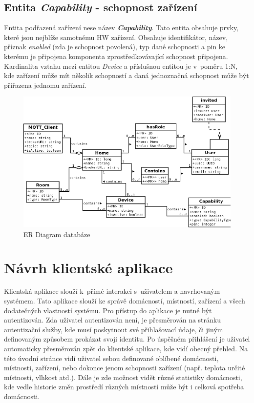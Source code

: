 \subsection*{Entita \emph{Capability} - schopnost zařízení}
\label{databaze:capability}
Entita podřazená zařízení nese název \textbf{\emph{Capability}}. Tato entita obsahuje prvky, které jsou nejblíže samotnému HW zařízení.
Obsahuje identifikátor, název, příznak \emph{enabled} (zda je schopnost povolená), typ dané schopnosti a pin ke kterému je připojena komponenta zprostředkovávající schopnost připojena.
Kardinalita vztahu mezi entitou \emph{Device} a příslušnou entitou je v~poměru 1:N, kde zařízení může mít několik schopností a daná jednoznačná schopnost může být přiřazena jednomu zařízení.

\begin{figure}[hbt]
  \centering
  \includegraphics[width=0.9 \linewidth]{obrazky-figures/erdiagram.png}
  \caption{ER Diagram databáze}
  \label{figure:er_databaze}
\end{figure}

\newpage
\section{Návrh klientské aplikace}
\label{navrh:frontend}

Klientská aplikace slouží k~přímé interakci s~uživatelem a navrhovaným systémem.
Tato aplikace slouží ke správě domácností, místností, zařízení a všech dodatečných vlastností systému.
Pro přístup do aplikace je nutné být autentizován.
Zda uživatel autentizován není, je přesměrován na stránku autentizační služby, kde musí poskytnout své přihlašovací údaje, či jiným definovaným způsobem prokázat svoji identitu.
Po úspěšném přihlášení je uživatel automaticky přesměrován zpět do klientské aplikace, kde vidí obecný přehled.
Na této úvodní stránce vidí uživatel sebou definované oblíbené domácnosti, místnosti, zařízení, nebo dokonce jenom schopnosti zařízení (např. teplota určité místnosti, vlhkost atd.).
Dále je zde možnost vidět různé statistiky domácnosti, kde vedle historie změn prostředí různých místností může být i celková spotřeba domácnosti.

